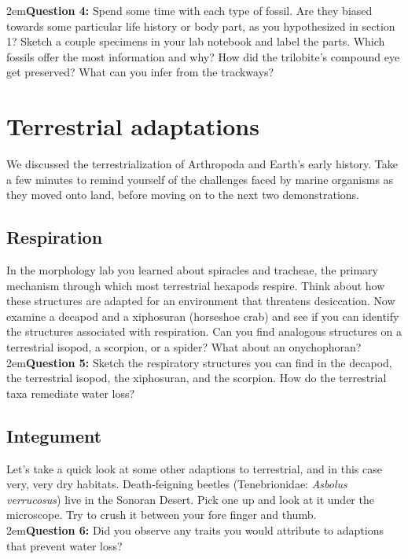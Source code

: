 \documentclass[letterpaper, 11pt]{article}
\begin{document}
\hangindent2em\textbf{Question 4:} Spend some time with each type of fossil. Are they biased towards some particular life history or body part, as you hypothesized in section 1? Sketch a couple specimens in your lab notebook and label the parts. Which fossils offer the most information and why? How did the trilobite's compound eye get preserved? What can you infer from the trackways?\\

\section{Terrestrial adaptations}
We discussed the terrestrialization of Arthropoda and Earth's early history. Take a few minutes to remind yourself of the challenges faced by marine organisms as they moved onto land, before moving on to the next two demonstrations.

\subsection{Respiration}
In the morphology lab you learned about spiracles and tracheae, the primary mechanism through which most terrestrial hexapods respire. Think about how these structures are adapted for an environment that threatens desiccation. Now examine a decapod and a xiphosuran (horseshoe crab) and see if you can identify the structures associated with respiration. Can you find analogous structures on a terrestrial isopod, a scorpion, or a spider? What about an onychophoran?\\

\hangindent2em\textbf{Question 5:} Sketch the respiratory structures you can find in the decapod, the terrestrial isopod, the xiphosuran, and the scorpion. How do the terrestrial taxa remediate water loss? \\

\subsection{Integument}
Let's take a quick look at some other adaptions to terrestrial, and in this case very, very dry habitats. Death-feigning beetles (Tenebrionidae: \textit{Asbolus verrucosus}) live in the Sonoran Desert. Pick one up and look at it under the microscope. Try to crush it between your fore finger and thumb.\\

\hangindent2em\textbf{Question 6:} Did you observe any traits you would attribute to adaptions that prevent water loss?\\
\end{document}
